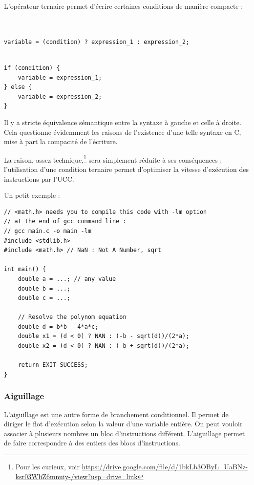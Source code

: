 \documentclass[../../../main.tex]{subfiles}
\begin{document}
L'opérateur ternaire permet d'écrire certaines conditions de manière compacte :
 
\begin{minipage}{0.65\textwidth}
\begin{verbatim}


variable = (condition) ? expression_1 : expression_2;


\end{verbatim}
\end{minipage}
\begin{minipage}{0.35\textwidth}
\begin{verbatim}
if (condition) {
	variable = expression_1;
} else {
	variable = expression_2;
}
\end{verbatim}
\end{minipage}
 
Il y a stricte équivalence sémantique entre la syntaxe à gauche et celle à droite. Cela questionne évidemment les raisons de l'existence d'une telle syntaxe en C, mise à part la compacité de l'écriture.
 
La raison, assez technique,\footnote{Pour les curieux, voir \url{https://drive.google.com/file/d/1bkLb3OByL_UaBNz-ksr03WliZ6mnuiy-/view?usp=drive_link}} sera simplement réduite à ses conséquences : l'utilisation d'une condition ternaire permet d'optimiser la vitesse d'exécution des instructions par l'UCC.
 
Un petit exemple :
\begin{verbatim}
// <math.h> needs you to compile this code with -lm option
// at the end of gcc command line :
// gcc main.c -o main -lm
#include <stdlib.h>
#include <math.h> // NaN : Not A Number, sqrt

int main() {
	double a = ...; // any value
	double b = ...;
	double c = ...;

	// Resolve the polynom equation
	double d = b*b - 4*a*c;
	double x1 = (d < 0) ? NAN : (-b - sqrt(d))/(2*a);
	double x2 = (d < 0) ? NAN : (-b + sqrt(d))/(2*a);

	return EXIT_SUCCESS;
}
\end{verbatim}
\subsubsection{Aiguillage}
 
L'aiguillage est une autre forme de branchement conditionnel. Il permet de diriger le flot d'exécution selon la valeur d'une variable entière. On peut vouloir associer à plusieurs nombres un bloc d'instructions différent. L'aiguillage permet de faire correspondre à des entiers des blocs d'instructions.
 
\end{document}
